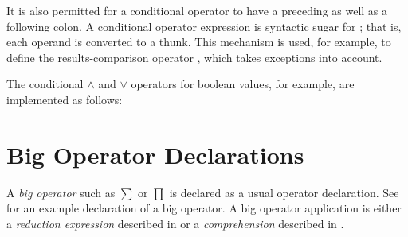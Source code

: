 It is also permitted for a conditional operator to have a preceding as
well as a following colon.  A conditional operator expression
 is syntactic sugar for ;
that is, each operand is converted to a thunk.  This mechanism  is
used, for example, to define the results-comparison operator
\txt{:$\sim$:}, which takes exceptions into account.


The conditional $\wedge$ and $\vee$ operators for
boolean values, for example, are implemented as follows:




\section{Big Operator Declarations}

A \emph{big operator} such as $\sum$ or $\prod$ is declared as a usual
operator declaration.
See  for an example declaration of a big operator.
A big operator application is either a \emph{reduction expression}
described in  or a \emph{comprehension}
described in .
